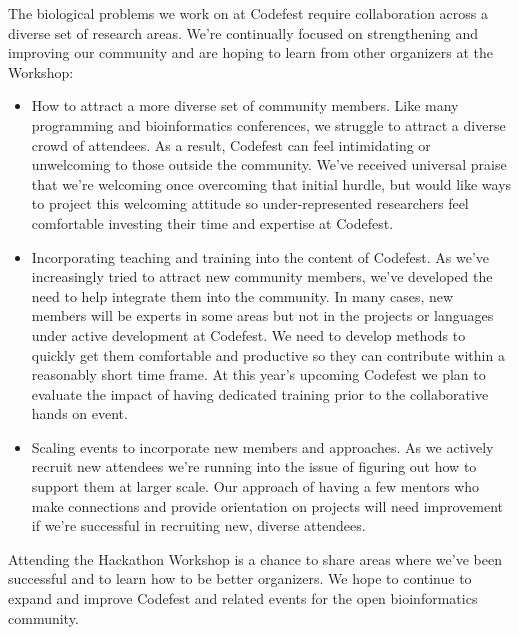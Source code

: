 \documentclass{sigchi-ext}
\begin{document}
The biological problems we work on at Codefest require collaboration across
a diverse set of research areas. We're
continually focused on strengthening and improving our community and are hoping
to learn from other organizers at the Workshop:

\begin{itemize}
\item How to attract a more diverse set of community members. Like many programming
  and bioinformatics conferences, we struggle to attract a diverse crowd of
  attendees. As a result, Codefest can feel intimidating or unwelcoming to those
  outside the community. We've received universal praise that we're welcoming
  once overcoming that initial hurdle, but would like ways to project this
  welcoming attitude so under-represented researchers feel comfortable investing
  their time and expertise at Codefest.

\item Incorporating teaching and training into the content of Codefest. As we've
  increasingly tried to attract new community members, we've developed the need
  to help integrate them into the community. In many cases, new members will be
  experts in some areas but not in the projects or languages under active
  development at Codefest. We need to develop methods to quickly get them
  comfortable and productive so they can contribute within a reasonably short
  time frame. At this year's upcoming Codefest we plan to evaluate the impact of
  having dedicated training prior to the collaborative hands on event.

\item Scaling events to incorporate new members and approaches. As we actively
  recruit new attendees we're running into the issue of figuring out how to
  support them at larger scale. Our approach of having a few mentors who make
  connections and provide orientation on projects will need improvement if we're
  successful in recruiting new, diverse attendees.
\end{itemize}

Attending the Hackathon Workshop is a chance to share areas where we've been
successful and to learn how to be better organizers. We hope to continue to
expand and improve Codefest and related events for the open bioinformatics
community.
\end{document}
